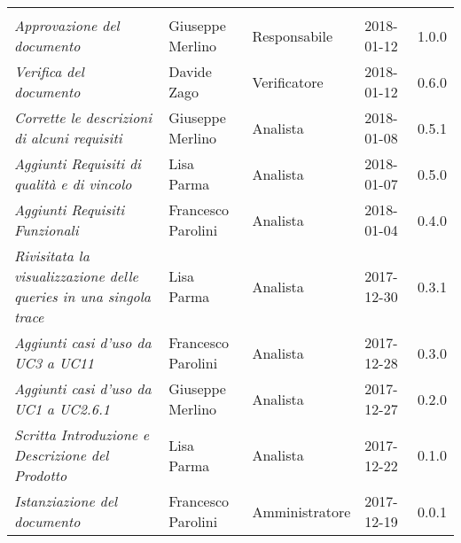 \newpage 
\section*{}
\begin{table}[H]
	\centering
	\begin{tabular}{p{4cm}|C{3cm}|C{3cm}|R{2.5cm}|R{2cm}}
		
		 & & & & \\
		
		
		\emph{Approvazione del documento}& Giuseppe Merlino & Responsabile & 2018-01-12 & 1.0.0 \\
		\hline
		
		\emph{Verifica del documento}& Davide Zago & Verificatore & 2018-01-12 & 0.6.0 \\
		\hline
		
		\emph{Corrette le descrizioni di alcuni requisiti}& Giuseppe Merlino & Analista & 2018-01-08 & 0.5.1 \\
		\hline
		
		\emph{Aggiunti Requisiti di qualità e di vincolo}& Lisa Parma & Analista & 2018-01-07 & 0.5.0 \\
		\hline
		
		\emph{Aggiunti Requisiti Funzionali}& Francesco Parolini & Analista & 2018-01-04 & 0.4.0 \\
		\hline
		
		\emph{Rivisitata la visualizzazione delle queries in una singola trace}& Lisa Parma & Analista & 2017-12-30 & 0.3.1 \\
		\hline
		
		\emph{Aggiunti casi d'uso da UC3 a UC11}& Francesco Parolini & Analista & 2017-12-28 & 0.3.0 \\
		\hline
		
		\emph{Aggiunti casi d'uso da UC1 a UC2.6.1}& Giuseppe Merlino & Analista & 2017-12-27 & 0.2.0 \\
		\hline
		
		\emph{Scritta Introduzione e Descrizione del Prodotto}& Lisa Parma & Analista & 2017-12-22 & 0.1.0 \\
		\hline
		
		\emph{Istanziazione del documento}& Francesco Parolini & Amministratore & 2017-12-19 & 0.0.1 \\
		\hline
		
	\end{tabular}
	
\end{table}


\clearpage